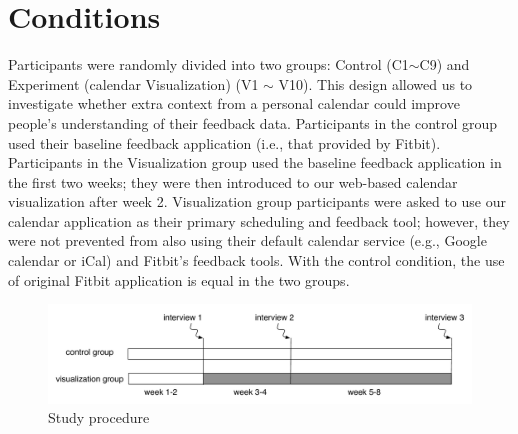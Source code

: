 \documentclass[12pt,oneside]{book}
\begin{document}
\section {Conditions}
Participants were randomly divided into two groups: Control (C1$\sim$C9) and Experiment (calendar Visualization) (V1 $\sim$ V10). This design allowed us to investigate whether extra context from a personal calendar could improve people's understanding of their feedback data. Participants in the control group used their baseline feedback application (i.e., that provided by Fitbit). Participants in the Visualization group used the baseline feedback application in the first two weeks; they were then introduced to our web-based calendar visualization after week 2. Visualization group participants were asked to use our calendar application as their primary scheduling and feedback tool; however, they were not prevented from also using their default calendar service (e.g., Google calendar or iCal) and Fitbit's feedback tools. With the control condition, the use of original Fitbit application is equal in the two groups.

\begin{figure}[h]
\centering
\includegraphics[width=\columnwidth]{figures/studydesign}
\caption{Study procedure }
\label{fig:studydesign}
\end{figure}
\end{document}
